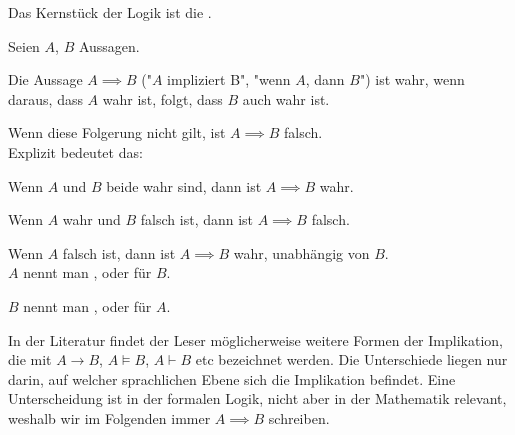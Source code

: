 Das Kernstück der Logik ist die .

\begin{definition}[Implikation]
    Seien $A$, $B$ Aussagen.
    
    Die Aussage $A \implies B$ ("$A$ impliziert B", "wenn $A$, dann $B$") ist wahr, wenn daraus, dass $A$ wahr ist, folgt, dass $B$ auch wahr ist.
    
    Wenn diese Folgerung nicht gilt, ist $A \implies B$ falsch.\\

    Explizit bedeutet das:

    Wenn $A$ und $B$ beide wahr sind, dann ist $A \implies B$ wahr.

    Wenn $A$ wahr und $B$ falsch ist, dann ist $A \implies B$ falsch.

    Wenn $A$ falsch ist, dann ist $A \implies B$ wahr, unabhängig von $B$.\\
    
    $A$ nennt man , oder  für $B$.
    
    $B$ nennt man , oder  für $A$.
\end{definition}

\begin{remark}
    In der Literatur findet der Leser möglicherweise weitere Formen der Implikation, die mit $A \rightarrow B$, $A \models B$, $A \vdash B$ etc bezeichnet werden. Die Unterschiede liegen nur darin, auf welcher sprachlichen Ebene sich die Implikation befindet. Eine Unterscheidung ist in der formalen Logik, nicht aber in der Mathematik relevant, weshalb wir im Folgenden immer $A \implies B$ schreiben.
\end{remark}

